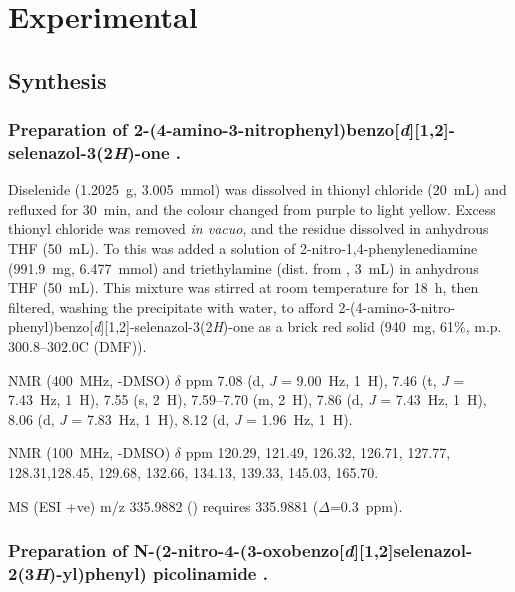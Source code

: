 \section{Experimental}
\subsection{Synthesis}
\subsubsection[Preparation of \refcmpd{ebs-nitroaniline}]{Preparation of 2-(4-amino-3-nitrophenyl)benzo[\emph{d}][1,2]-selenazol-3(2\emph{H})-one .}

Diselenide  (1.2025~g, 3.005~mmol) was dissolved in thionyl chloride (20~mL) and refluxed for 30~min, and the colour changed from purple to light yellow. 
Excess thionyl chloride was removed \emph{in vacuo}, and the residue dissolved in anhydrous THF (50~mL). 
To this was added a solution of 2-nitro-1,4-phenylenediamine (991.9~mg, 6.477~mmol) and triethylamine (dist. from , 3~mL) in anhydrous THF (50~mL). 
This mixture was stirred at room temperature for 18~h, then filtered, washing the precipitate with water, to afford 2-(4-amino-3-nitro-phenyl)benzo[\emph{d}][1,2]-selenazol-3(2\emph{H})-one  as a brick red solid (940~mg, 61\%, m.p. 300.8--302.0\degree C (DMF)).

{\footnotesize

 NMR (400~MHz, -DMSO) $\delta$ ppm
7.08 (d, \emph{J} = 9.00~Hz, 1~H), 7.46 (t, \emph{J} = 7.43~Hz, 1~H), 7.55 (s, 2~H), 7.59--7.70 (m, 2~H), 7.86 (d, \emph{J} = 7.43~Hz, 1~H), 8.06 (d, \emph{J} = 7.83~Hz, 1~H), 8.12 (d, \emph{J} = 1.96~Hz, 1~H).

 NMR (100~MHz, -DMSO) $\delta$ ppm
120.29, 121.49, 126.32, 126.71, 127.77, 128.31,128.45, 129.68, 132.66, 134.13, 139.33, 145.03, 165.70.

MS (ESI +ve) m/z 335.9882 ()  requires 335.9881 ($\Delta$=0.3~ppm).
}

\subsubsection[Preparation of \refcmpd{ebs-nitroamide-2py}]{Preparation of N-(2-nitro-4-(3-oxobenzo[\emph{d}][1,2]selenazol-2(3\emph{H})-yl)phenyl) picolinamide .}

